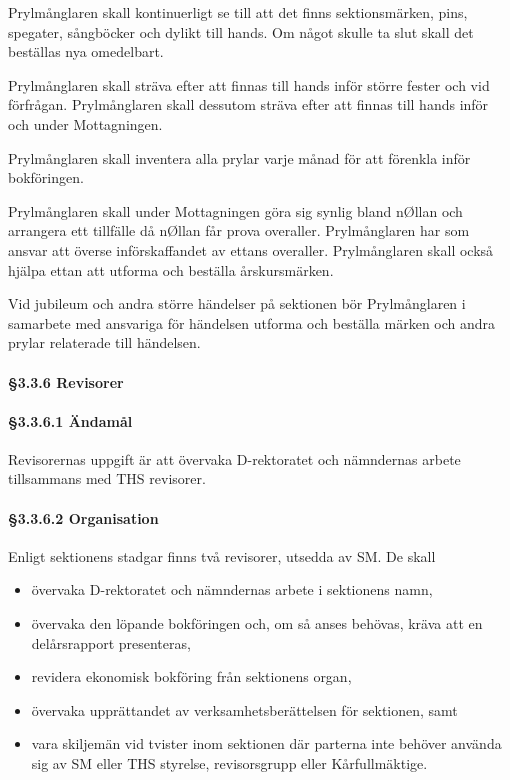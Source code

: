 Prylmånglaren skall kontinuerligt se till att det finns sektionsmärken, pins, spegater, sångböcker och dylikt till hands. Om något skulle ta slut skall det beställas nya omedelbart.

Prylmånglaren skall sträva efter att finnas till hands inför större fester och vid förfrågan. Prylmånglaren skall dessutom sträva efter att finnas till hands inför och under Mottagningen.

Prylmånglaren skall inventera alla prylar varje månad för att förenkla inför bokföringen.

Prylmånglaren skall under Mottagningen göra sig synlig bland nØllan och arrangera ett tillfälle då nØllan får prova overaller. Prylmånglaren har som ansvar att överse införskaffandet av ettans overaller. Prylmånglaren skall också hjälpa ettan att utforma och beställa årskursmärken.

Vid jubileum och andra större händelser på sektionen bör Prylmånglaren i samarbete med ansvariga för händelsen utforma och beställa märken och andra prylar relaterade till händelsen.

\paragraph{§3.3.6 Revisorer}

\paragraph{§3.3.6.1 Ändamål}

Revisorernas uppgift är att övervaka D-rektoratet och nämndernas arbete tillsammans med THS revisorer.

\paragraph{§3.3.6.2 Organisation}

Enligt sektionens stadgar finns två revisorer, utsedda av SM. De skall

\begin{itemize}
  \item övervaka D-rektoratet och nämndernas arbete i sektionens namn,
  \item övervaka den löpande bokföringen och, om så anses behövas, kräva att en delårsrapport presenteras,
  \item revidera ekonomisk bokföring från sektionens organ,
  \item övervaka upprättandet av verksamhetsberättelsen för sektionen, samt
  \item vara skiljemän vid tvister inom sektionen där parterna inte behöver använda sig av SM eller THS styrelse, revisorsgrupp eller Kårfullmäktige.
\end{itemize}

